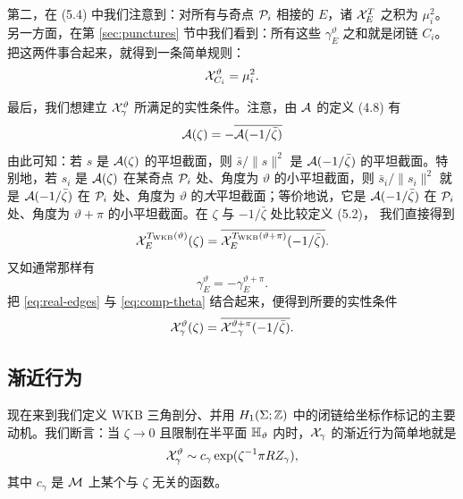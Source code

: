 第二，在 (5.4) 中我们注意到：对所有与奇点 $\mathcal{P}_i$ 相接的 $E$，诸 $\mathcal{X}^T_E$ 之积为 $\mu_i^{2}$。%
另一方面，在第 \ref{sec:punctures} 节中我们看到：所有这些 $\gamma^\vartheta_E$ 之和就是闭链 $C_i$。把这两件事合起来，就得到一条简单规则：
\begin{equation} \label{eq:monodromy}
\mathcal{X}^\vartheta_{C_i} = \mu_i^{2}.
\end{equation}

最后，我们想建立 $\mathcal{X}^\vartheta_\gamma$ 所满足的实性条件。注意，由 $\mathcal{A}$ 的定义 (4.8)%
有
\begin{equation}\label{eq:CA-conjugation}
\mathcal{A}(\zeta) = - \overline{\mathcal{A}(-1/\bar\zeta)}
\end{equation}
由此可知：若 $s$ 是 $\mathcal{A}(\zeta)$ 的平坦截面，则 $\bar{s}/\|s\|^2$ 是 $\mathcal{A}(-1/\bar\zeta)$ 的平坦截面。特别地，若 $s_i$ 是 $\mathcal{A}(\zeta)$ 在某奇点 $\mathcal{P}_i$ 处、角度为 $\vartheta$ 的小平坦截面，则 $\bar{s}_i/\|s_i\|^2$ 就是 $\mathcal{A}(-1/\bar\zeta)$ 在 $\mathcal{P}_i$ 处、角度为 $\vartheta$ 的\emph{大}平坦截面；等价地说，它是 $\mathcal{A}(-1/\bar\zeta)$ 在 $\mathcal{P}_i$ 处、角度为 $\vartheta+\pi$ 的小平坦截面。在 $\zeta$ 与 $-1/\bar\zeta$ 处比较定义 (5.2)，%
我们直接得到
\begin{equation} \label{eq:real-edges}
\mathcal{X}^{T_{\rm WKB}(\vartheta)}_E (\zeta) = \overline{\mathcal{X}^{T_{\rm WKB}(\vartheta + \pi)}_E (- 1 / \bar\zeta)}.
\end{equation}
又如通常那样有
\begin{equation} \label{eq:comp-theta}
\gamma^\vartheta_E = - \gamma^{\vartheta+\pi}_E.
\end{equation}
把 \eqref{eq:real-edges} 与 \eqref{eq:comp-theta} 结合起来，便得到所要的实性条件
\begin{equation}\label{eq:reality}
\mathcal{X}^{\vartheta}_{\gamma} (\zeta) = \overline{\mathcal{X}^{\vartheta+\pi}_{-\gamma} (- 1 / \bar\zeta)}.
\end{equation}

\subsection{渐近行为}\label{sec:asymptotics}

现在来到我们定义 WKB 三角剖分、并用 $H_1(\Sigma;\mathbb{Z})$ 中的闭链给坐标作标记的主要动机。我们断言：当 $\zeta\to0$ 且限制在半平面 ${\mathbb{H}}_\vartheta$ 内时，$\mathcal{X}_\gamma$ 的渐近行为简单地就是
\begin{equation} \label{eq:wkb-asymp}
\mathcal{X}^\vartheta_\gamma \sim c_\gamma \exp(\zeta^{-1} \pi R Z_\gamma),
\end{equation}
其中 $c_\gamma$ 是 $\mathcal{M}$ 上某个与 $\zeta$ 无关的函数。

